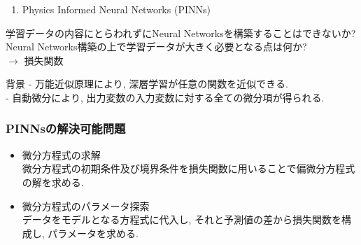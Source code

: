 \documentclass[xcolor=dvipsnames,hyperref={breaklinks=true},mathserif,professionalfont,dvipdfmx,12pt]{beamer}
\begin{document}
\begin{frame}
  \setcounter{enumi}{3}
  \begin{enumerate}
    \item \alert{Physics Informed Neural Networks (PINNs)}
  \end{enumerate}
 学習データの内容にとらわれずにNeural Networksを構築することはできないか?\\
 Neural Networks構築の上で学習データが大きく必要となる点は何か?\\
  $\rightarrow$ 損失関数\\
  \vspace{5pt}

  \begin{block}{背景}
    - 万能近似原理により, 深層学習が任意の関数を近似できる.\\
    - 自動微分により, 出力変数の入力変数に対する全ての微分項が得られる.
  \end{block}
  

\end{frame}



\begin{frame}
  \frametitle{PINNsの解決可能問題}
  \begin{itemize}
    \item 微分方程式の求解\\
    微分方程式の初期条件及び境界条件を損失関数に用いることで偏微分方程式の解を求める. 
    \item 微分方程式のパラメータ探索\\
    データをモデルとなる方程式に代入し, それと予測値の差から損失関数を構成し, パラメータを求める. 
  \end{itemize}
\end{frame}
\end{document}
